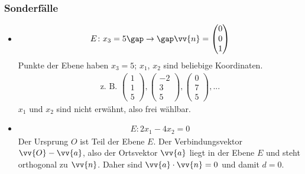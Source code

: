 \subsubsection{Sonderfälle}
\begin{itemize}
  \item
  \begin{gather*}
    E \colon x_3 = 5 \gap\rightarrow\gap \vv{n} = \begin{pmatrix}0 \\ 0 \\ 1\end{pmatrix}
  \end{gather*}
  Punkte der Ebene haben $x_3 = 5$; $x_1$, $x_2$ sind beliebige Koordinaten.
  \begin{gather*}
    \text{z. B. } \begin{pmatrix}1 \\ 1 \\ 5\end{pmatrix}, \begin{pmatrix}-2 \\ 3 \\ 5\end{pmatrix}, \begin{pmatrix}0 \\ 7 \\ 5\end{pmatrix}, ...
  \end{gather*}
  $x_1$ und $x_2$ sind nicht erwähnt, also frei wählbar.
  \item
  \begin{gather*}
    E \colon 2x_1 - 4x_2 = 0
  \end{gather*}
  Der Ursprung $O$ ist Teil der Ebene $E$. Der Verbindungsvektor $\vv{O} - \vv{a}$, also der Ortsvektor $\vv{a}$ liegt in der Ebene $E$ und steht orthogonal zu $\vv{n}$. Daher sind $\vv{a} \cdot \vv{n} = 0$ und damit $d = 0$.
\end{itemize}
